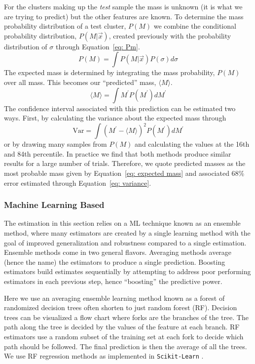 \documentclass[fleqn,usenatbib]{mnras}
\begin{document}
For the clusters making up the \emph{test} sample the mass is unknown (it is what we are trying to predict) but the other features are known. To determine the mass probability distribution of a test cluster, $P(M)$ we combine the conditional probability distribution, $P(M|\vec{x})$, created previously with the probability distribution of $\sigma$ through Equation~\ref{eq: Pm}.
\begin{equation}\label{eq: Pm}
	P(M) = \int P(M|\vec{x}) P(\sigma) d\sigma
\end{equation}
The expected mass is determined by integrating the mass probability, $P(M)$ over all mass. This becomes our ``predicted'' mass, $\langle M\rangle$.
\begin{equation}\label{eq: expected mass}
	\langle M\rangle = \int M^\prime P(M^\prime)dM^\prime
\end{equation}
The confidence interval associated with this prediction can be estimated two ways. First, by calculating the variance about the expected mass through
\begin{equation}\label{eq: variance}
	\mathrm{Var} = \int (M^\prime - \langle M\rangle)^2 P(M^\prime)dM^\prime
\end{equation}
or by drawing many samples from $P(M)$ and calculating the values at the 16th and 84th percentile. In practice we find that both methods produce similar results for a large number of trials. Therefore, we quote predicted masses as the most probable mass given by Equation~\ref{eq: expected mass} and associated 68\% error estimated through Equation~\ref{eq: variance}.

\subsubsection{Machine Learning Based}\label{sec:machine learning method}
The estimation in this section relies on a ML technique known as an ensemble method, where many estimators are created by a single learning method with the goal of improved generalization and robustness compared to a single estimation. Ensemble methods come in two general flavors. Averaging methods average (hence the name) the estimators to produce a single prediction. Boosting estimators build estimates sequentially by attempting to address poor performing estimators in each previous step, hence ``boosting'' the predictive power.

Here we use an averaging ensemble learning method known as a forest of randomized decision trees often shorten to just random forest (RF). Decision trees can be visualized a flow chart where forks are the branches of the tree. The path along the tree is decided by the values of the feature at each branch. RF estimators use a random subset of the training set at each fork to decide which path should be followed. The final prediction is then the average of all the trees. We use RF regression methods as implemented in {\tt Scikit-Learn} \citep{Pedregosa2012}.
\end{document}
